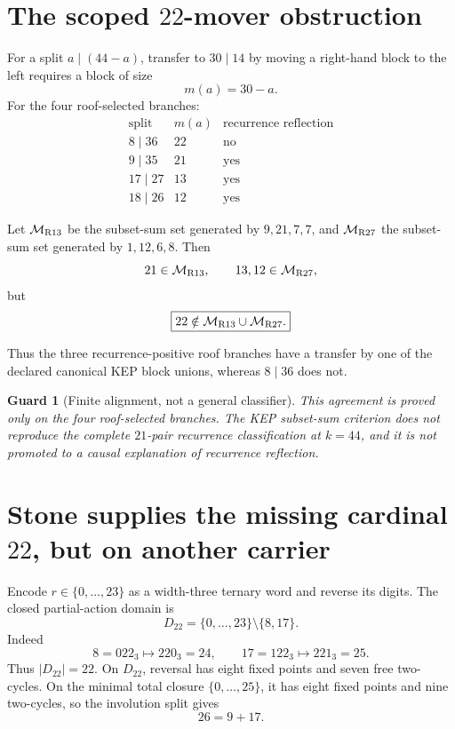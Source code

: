 \documentclass[11pt,a4paper]{article}
\newtheorem{guard}[definition]{Guard}
\begin{document}
\section{The scoped \(22\)-mover obstruction}

For a split \(a\mid(44-a)\), transfer to \(30\mid14\) by moving a
right-hand block to the left requires a block of size
\[
m(a)=30-a.
\]
For the four roof-selected branches:
\[
\begin{array}{c|c|c}
\text{split}&m(a)&\text{recurrence reflection}\\\hline
8\mid36&22&\text{no}\\
9\mid35&21&\text{yes}\\
17\mid27&13&\text{yes}\\
18\mid26&12&\text{yes}
\end{array}
\]

Let \(\mathcal M_{\rm R13}\) be the subset-sum set generated by
\(9,21,7,7\), and \(\mathcal M_{\rm R27}\) the subset-sum set generated
by \(1,12,6,8\).  Then
\[
21\in\mathcal M_{\rm R13},\qquad
13,12\in\mathcal M_{\rm R27},
\]
but
\[
\boxed{
22\notin\mathcal M_{\rm R13}\cup\mathcal M_{\rm R27}.
}
\]

Thus the three recurrence-positive roof branches have a transfer by one
of the declared canonical KEP block unions, whereas \(8\mid36\) does
not.

\begin{guard}[Finite alignment, not a general classifier]
This agreement is proved only on the four roof-selected branches.
The KEP subset-sum criterion does not reproduce the complete
\(21\)-pair recurrence classification at \(k=44\), and it is not
promoted to a causal explanation of recurrence reflection.
\end{guard}

\section{Stone supplies the missing cardinal \(22\), but on another carrier}

Encode \(r\in\{0,\ldots,23\}\) as a width-three ternary word and reverse
its digits.  The closed partial-action domain is
\[
\boxed{
D_{22}=\{0,\ldots,23\}\setminus\{8,17\}.
}
\]
Indeed
\[
8=022_3\mapsto220_3=24,\qquad
17=122_3\mapsto221_3=25.
\]
Thus \(|D_{22}|=22\).  On \(D_{22}\), reversal has eight fixed points
and seven free two-cycles.  On the minimal total closure
\(\{0,\ldots,25\}\), it has eight fixed points and nine two-cycles,
so the involution split gives
\[
\boxed{26=9+17.}
\]
\end{document}
